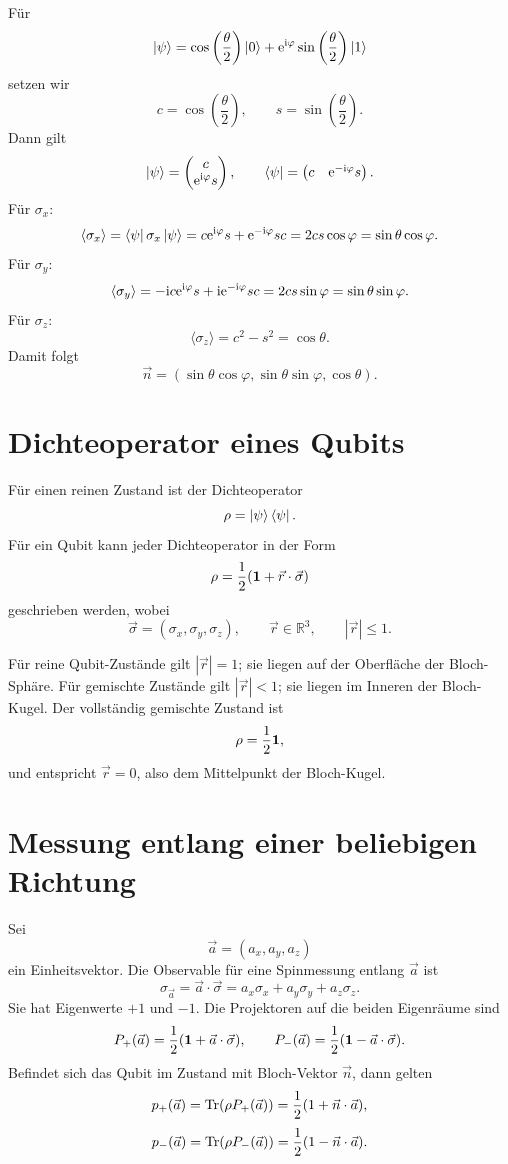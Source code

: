 \begin{derivationbox}
Für
\[
    \left|\psi\right\rangle
    =\cos\left(\frac{\theta}{2}\right)\left|0\right\rangle
    +\mathrm{e}^{\mathrm{i}\varphi}\sin\left(\frac{\theta}{2}\right)\left|1\right\rangle
\]
setzen wir
\[
    c=\cos\left(\frac{\theta}{2}\right),
    \qquad
    s=\sin\left(\frac{\theta}{2}\right).
\]
Dann gilt
\[
    \left|\psi\right\rangle=\begin{pmatrix}c\\ \mathrm{e}^{\mathrm{i}\varphi}s\end{pmatrix},
    \qquad
    \left\langle\psi\right|=\begin{pmatrix}c& \mathrm{e}^{-\mathrm{i}\varphi}s\end{pmatrix}.
\]
Für \(\sigma_x\):
\[
    \langle \sigma_x\rangle
    =\left\langle\psi\right|\sigma_x\left|\psi\right\rangle
    =c\mathrm{e}^{\mathrm{i}\varphi}s+\mathrm{e}^{-\mathrm{i}\varphi}sc
    =2cs\cos\varphi
    =\sin\theta\cos\varphi.
\]
Für \(\sigma_y\):
\[
    \langle \sigma_y\rangle
    =-\mathrm{i} c\mathrm{e}^{\mathrm{i}\varphi}s+\mathrm{i}\mathrm{e}^{-\mathrm{i}\varphi}sc
    =2cs\sin\varphi
    =\sin\theta\sin\varphi.
\]
Für \(\sigma_z\):
\[
    \langle \sigma_z\rangle
    =c^2-s^2
    =\cos\theta.
\]
Damit folgt
\[
    \vec n=(\sin\theta\cos\varphi,\sin\theta\sin\varphi,\cos\theta).
\]
\end{derivationbox}

\section{Dichteoperator eines Qubits}

Für einen reinen Zustand ist der Dichteoperator
\[
    \rho=\left|\psi\right\rangle\left\langle\psi\right|.
\]
Für ein Qubit kann jeder Dichteoperator in der Form
\[
    \rho=\frac12(\mathbf{1}+\vec r\cdot\vec\sigma)
\]
geschrieben werden, wobei
\[
    \vec\sigma=(\sigma_x,\sigma_y,\sigma_z),
    \qquad
    \vec r\in\mathbb R^3,
    \qquad
    |\vec r|\le 1.
\]

\begin{conceptbox}
Für reine Qubit-Zustände gilt \(|\vec r|=1\); sie liegen auf der Oberfläche der Bloch-Sphäre. Für gemischte Zustände gilt \(|\vec r|<1\); sie liegen im Inneren der Bloch-Kugel. Der vollständig gemischte Zustand ist
\[
    \rho=\frac12\mathbf{1},
\]
und entspricht \(\vec r=0\), also dem Mittelpunkt der Bloch-Kugel.
\end{conceptbox}

\section{Messung entlang einer beliebigen Richtung}

Sei
\[
    \vec a=(a_x,a_y,a_z)
\]
ein Einheitsvektor. Die Observable für eine Spinmessung entlang \(\vec a\) ist
\[
    \sigma_{\vec a}=\vec a\cdot\vec\sigma
    =a_x\sigma_x+a_y\sigma_y+a_z\sigma_z.
\]
Sie hat Eigenwerte \(+1\) und \(-1\). Die Projektoren auf die beiden Eigenräume sind
\[
    P_+(\vec a)=\frac12(\mathbf{1}+\vec a\cdot\vec\sigma),
    \qquad
    P_-(\vec a)=\frac12(\mathbf{1}-\vec a\cdot\vec\sigma).
\]
Befindet sich das Qubit im Zustand mit Bloch-Vektor \(\vec n\), dann gelten
\[
    p_+(\vec a)=\operatorname{Tr}(\rho P_+(\vec a))
    =\frac12(1+\vec n\cdot\vec a),
\]
\[
    p_-(\vec a)=\operatorname{Tr}(\rho P_-(\vec a))
    =\frac12(1-\vec n\cdot\vec a).
\]

